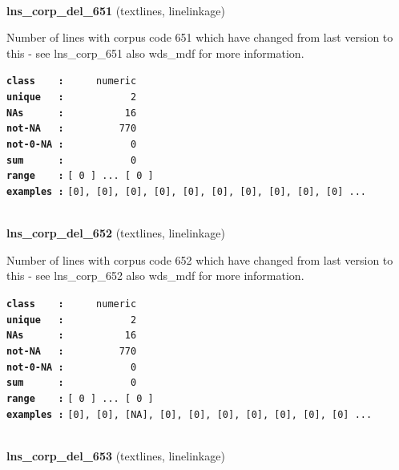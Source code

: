 \documentclass[]{article}
\begin{document}
~

\textbf{lns\_corp\_del\_651} (textlines, linelinkage)

Number of lines with corpus code 651 which have changed from last
version to this - see lns\_corp\_651 also wds\_mdf for more information.

\textbf{\texttt{class\ \ \ \ :}} \texttt{~~~~~numeric}\\
\textbf{\texttt{unique\ \ \ :}} \texttt{~~~~~~~~~~~2}\\
\textbf{\texttt{NAs\ \ \ \ \ \ :}} \texttt{~~~~~~~~~~16}\\
\textbf{\texttt{not-NA\ \ \ :}} \texttt{~~~~~~~~~770}\\
\textbf{\texttt{not-0-NA\ :}} \texttt{~~~~~~~~~~~0}\\
\textbf{\texttt{sum\ \ \ \ \ \ :}} \texttt{~~~~~~~~~~~0}\\
\textbf{\texttt{range\ \ \ \ :}}
\texttt{{[}\ 0\ {]}\ ...\ {[}\ 0\ {]}}\\
\textbf{\texttt{examples\ :}}
\texttt{{[}0{]},\ {[}0{]},\ {[}0{]},\ {[}0{]},\ {[}0{]},\ {[}0{]},\ {[}0{]},\ {[}0{]},\ {[}0{]},\ {[}0{]}\ ...}\\

~

\textbf{lns\_corp\_del\_652} (textlines, linelinkage)

Number of lines with corpus code 652 which have changed from last
version to this - see lns\_corp\_652 also wds\_mdf for more information.

\textbf{\texttt{class\ \ \ \ :}} \texttt{~~~~~numeric}\\
\textbf{\texttt{unique\ \ \ :}} \texttt{~~~~~~~~~~~2}\\
\textbf{\texttt{NAs\ \ \ \ \ \ :}} \texttt{~~~~~~~~~~16}\\
\textbf{\texttt{not-NA\ \ \ :}} \texttt{~~~~~~~~~770}\\
\textbf{\texttt{not-0-NA\ :}} \texttt{~~~~~~~~~~~0}\\
\textbf{\texttt{sum\ \ \ \ \ \ :}} \texttt{~~~~~~~~~~~0}\\
\textbf{\texttt{range\ \ \ \ :}}
\texttt{{[}\ 0\ {]}\ ...\ {[}\ 0\ {]}}\\
\textbf{\texttt{examples\ :}}
\texttt{{[}0{]},\ {[}0{]},\ {[}NA{]},\ {[}0{]},\ {[}0{]},\ {[}0{]},\ {[}0{]},\ {[}0{]},\ {[}0{]},\ {[}0{]}\ ...}\\

~

\textbf{lns\_corp\_del\_653} (textlines, linelinkage)
\end{document}
